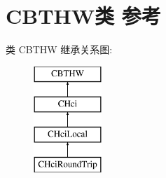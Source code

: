 \hypertarget{class_c_b_t_h_w}{}\section{C\+B\+T\+H\+W类 参考}
\label{class_c_b_t_h_w}
类 C\+B\+T\+HW 继承关系图\+:\begin{figure}[H]
\begin{center}
\leavevmode
\includegraphics[height=4.000000cm]{class_c_b_t_h_w}
\end{center}
\end{figure}
